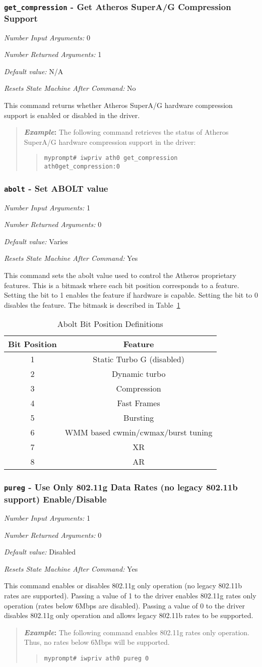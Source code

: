 \documentclass[10pt,fullpage]{article}
\newcommand{\mytt}[1]{{\texttt{#1}}}
\newcommand{\bv}{\begin{verse}}
\newcommand{\ev}{\end{verse}}
\newcommand{\cmd}[1]{{\texttt{myprompt\# #1}}}
\newcommand{\argdesc}[4]{\begin{description}
\itemsep -6pt
\item \textit{Number Input Arguments:} #1
\item \textit{Number Returned Arguments:} #2
\item \textit{Default value:} #3
\item \textit{Resets State Machine After Command:} #4
\end{description}
}
\newenvironment{example}{\begin{quote}\textbf{\textit{Example}:}}{\end{quote}}
\begin{document}
\subsubsection{\mytt{get\_compression} - Get Atheros SuperA/G Compression Support}
\argdesc{0}{1}{N/A}{No}
This command returns whether Atheros SuperA/G hardware compression support is enabled or disabled
in the driver.
\begin{example}
The following command retrieves the status of Atheros SuperA/G
hardware compression support in the driver:
\bv
\cmd{iwpriv ath0 get\_compression}\\
\mytt{ath0\hspace{32pt}get\_compression:0}
\ev
\end{example}

\subsubsection{\mytt{abolt} - Set ABOLT value}
\argdesc{1}{0}{Varies}{Yes}
This command sets the abolt value used to control the Atheros
proprietary features.  This is a bitmask where each bit position
corresponds to a feature.  Setting the bit to 1 enables the feature if
hardware is capable.  Setting the bit to 0 disables the feature.  The
bitmask is described in Table~\ref{tab:abolt}
\begin{table}[h*]
  \centering
  \begin{tabular}{|c|c|} \hline
    Bit Position & Feature \\ \hline
    1 & Static Turbo G (disabled) \\
    2 & Dynamic turbo \\
    3 & Compression \\
    4 & Fast Frames \\
    5 & Bursting \\
    6 & WMM based cwmin/cwmax/burst tuning \\
    7 & XR \\
    8 & AR \\ \hline
  \end{tabular}
  \caption{Abolt Bit Position Definitions}
  \label{tab:abolt}
\end{table}

\subsubsection{\mytt{pureg} - Use Only 802.11g Data Rates (no legacy 802.11b
  support) Enable/Disable}
\argdesc{1}{0}{Disabled}{Yes}
This command enables or disables 802.11g only operation (no legacy
802.11b rates are supported).  Passing a value of 1 to the driver
enables 802.11g rates only operation (rates below 6Mbps are disabled).
Passing a value of 0 to the driver disables 802.11g only operation and
allows legacy 802.11b rates to be supported.
\begin{example}
The following command enables 802.11g rates only operation.  Thus, no
rates below 6Mbps will be supported.
\bv
\cmd{iwpriv ath0 pureg 0}
\ev
\end{example}
\end{document}
